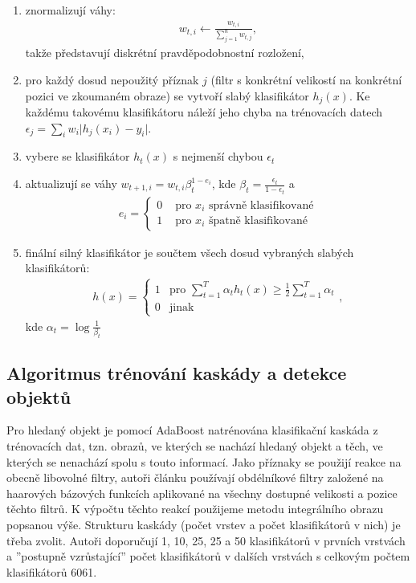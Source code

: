 	\begin{enumerate}
		\item znormalizují váhy:
		\begin{align}
			w_{t,i} \leftarrow \frac{w_{t,i}}{\sum_{j=1}^{n}w_{t,j}},
		\end{align}
		takže představují diskrétní pravděpodobnostní rozložení,
		\item pro každý dosud nepoužitý příznak $j$ (filtr s konkrétní velikostí na konkrétní pozici ve zkoumaném obraze) se vytvoří slabý klasifikátor $h_j(x)$. Ke každému takovému klasifikátoru náleží jeho chyba na trénovacích datech $\epsilon_j = \sum_{i} w_i \lvert h_j(x_i)-y_i \rvert$.
		\item vybere se klasifikátor $h_t(x)$ s nejmenší chybou $\epsilon_t$
		\item aktualizují se váhy $w_{t+1,i} = w_{t,i}\beta_t^{1-e_i}$, kde $\beta_t = \frac{\epsilon_t}{1 - \epsilon_t}$ a 
		\begin{align}
		e_i = \begin{cases}
		0 & \text{ pro } x_i \text{ správně klasifikované} \\
		1 & \text{ pro } x_i \text{ špatně klasifikované} 
		\end{cases}
		\end{align} 
		\item finální silný klasifikátor je součtem všech dosud vybraných slabých klasifikátorů:
		\begin{align}
		h(x) = \begin{cases}
				1 & \text{pro } \sum_{t=1}^{T} \alpha_t h_t(x) \geq \frac{1}{2} \sum_{t=1}^{T} \alpha_t \\
				0 & \text{jinak}
			   \end{cases},
		\end{align}
		kde $\alpha_t = \log \frac{1}{\beta_t}$
	\end{enumerate}
	
	\subsection{Algoritmus trénování kaskády a detekce objektů}
	
	Pro hledaný objekt je pomocí AdaBoost natrénována klasifikační kaskáda z trénovacích dat, tzn. obrazů, ve kterých se nachází hledaný objekt a těch, ve kterých se nenachází spolu s touto informací. Jako příznaky se použijí reakce na obecně libovolné filtry, autoři článku používají obdélníkové filtry založené na haarových bázových funkcích aplikované na všechny dostupné velikosti a pozice těchto filtrů. K výpočtu těchto reakcí použijeme metodu integrálního obrazu popsanou výše. Strukturu kaskády (počet vrstev a počet klasifikátorů v nich) je třeba zvolit. Autoři doporučují 1, 10, 25, 25 a 50 klasifikátorů v prvních vrstvách a ''postupně vzrůstající''  počet klasifikátorů v dalších vrstvách s celkovým počtem klasifikátorů 6061.

